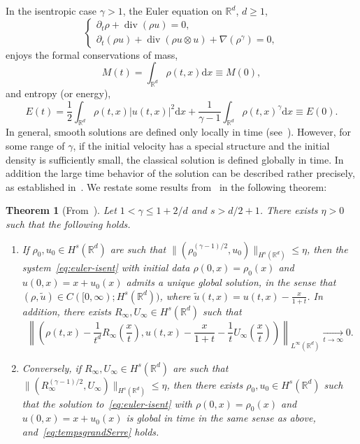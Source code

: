 \documentclass[11pt]{article}
\newtheorem{theo}{Theorem}[section]
\theoremstyle{definition}
\numberwithin{equation}{section}
\numberwithin{figure}{section}
\numberwithin{table}{section}
\DeclareMathOperator{\DIV}{div}
\newcommand*\R{\mathbb{R}}
\newcommand*\dd {\mathrm{d}}
\newcommand*\<{\left\langle}
\renewcommand*\>{\right\rangle}
\renewcommand*\le{\leqslant}
\renewcommand*\ge{\geqslant}
\newcommand*\Tend[2]{\mathop{\longrightarrow}\limits_{#1\rightarrow#2}}
\begin{document}
In the isentropic case $\gamma>1$, the Euler equation on $\R^d$, $d\ge 1$,
\begin{equation}\label{eq:euler-isent}
\begin{cases}
\partial_t \rho+\DIV\left(\rho u\right)=0,\\
\partial_t (\rho u) +\DIV(\rho u\otimes u)+\nabla
\left(\rho^\gamma\right)= 0,
\end{cases}
\end{equation}
enjoys the formal conservations of mass,
\begin{equation*}
M(t) =\int_{\R^d}\rho(t,x)\dd x\equiv M(0),
\end{equation*}
and entropy (or energy),
\begin{equation*}
E(t) = \frac{1}{2}\int_{\R^d} \rho (t,x) |u(t,x)|^2 \dd x+\frac{1}{\gamma-1}\int_{\R^d}\rho(t,x)^\gamma
\dd x \equiv E(0).
\end{equation*}
In general, smooth solutions are defined only locally in time (see~\cite{MUK86,JYC90,Xin98}). However, for some range of $\gamma$, if the initial velocity has a special structure and the initial density is sufficiently small, the classical solution is defined globally in time. In addition the large time behavior of the solution can be described rather precisely, as established in~\cite{Serre97}. We restate some results from~\cite{Serre97} in the following theorem:
\begin{theo}[From~\cite{Serre97}]\label{theo:serre}
Let $1<\gamma\le 1+2/d$ and $s>d/2+1$. There exists $\eta>0$ such that the following holds.
\begin{enumerate}
\item \label{1.1.1} If $\rho_0,u_0\in H^s(\R^d)$ are such that $\|(\rho_0^{(\gamma-1)/2},u_0)\|_{H^s(\R^d)}\le \eta $, then the system~\eqref{eq:euler-isent} with initial data $\rho(0,x) = \rho_0(x)$ and $u(0,x) = x + u_0(x)$ admits a unique global solution, in the sense that $(\rho,\tilde u)\in C([0,\infty);H^s(\R^d))$, where $\tilde u(t,x)=u(t,x)-\frac{x}{1+t}$. In addition, there exists $R_\infty,U_\infty\in H^s(\R^d)$ such that
\begin{equation}\label{eq:tempsgrandSerre}
\left\| \left(\rho (t,x)-\frac{1}{t^d}R_\infty\left(\frac{x}{t}\right),u(t,x) -\frac{x}{1+t}-\frac{1}{t}U_\infty
\left(\frac{x}{t}\right)\right)\right\|_{L^\infty(\R^d)}\Tend t \infty 0.
\end{equation}
\item \label{1.1.2} Conversely, if $R_\infty,U_\infty\in H^s(\R^d)$ are such that $\|(R_\infty^{(\gamma-1)/2},U_\infty)\|_{H^s(\R^d)}\le \eta$, then there exists $\rho_0,u_0\in H^s(\R^d)$ such that the solution to~\eqref{eq:euler-isent} with $ \rho(0,x)=\rho_0(x)$ and $ u(0,x) = x+u_0(x)$ is global in time in the same sense as above, and~\eqref{eq:tempsgrandSerre} holds.
\end{enumerate}
\end{theo}
\end{document}
